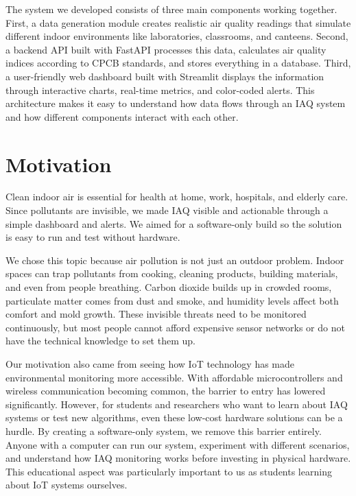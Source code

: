 \documentclass[12pt]{report}
\begin{document}
The system we developed consists of three main components working together. First, a data generation module creates realistic air quality readings that simulate different indoor environments like laboratories, classrooms, and canteens. Second, a backend API built with FastAPI processes this data, calculates air quality indices according to CPCB standards, and stores everything in a database. Third, a user-friendly web dashboard built with Streamlit displays the information through interactive charts, real-time metrics, and color-coded alerts. This architecture makes it easy to understand how data flows through an IAQ system and how different components interact with each other.

\section{Motivation}
Clean indoor air is essential for health at home, work, hospitals, and elderly care. Since pollutants are invisible, we made IAQ visible and actionable through a simple dashboard and alerts. We aimed for a software-only build so the solution is easy to run and test without hardware.

We chose this topic because air pollution is not just an outdoor problem. Indoor spaces can trap pollutants from cooking, cleaning products, building materials, and even from people breathing. Carbon dioxide builds up in crowded rooms, particulate matter comes from dust and smoke, and humidity levels affect both comfort and mold growth. These invisible threats need to be monitored continuously, but most people cannot afford expensive sensor networks or do not have the technical knowledge to set them up.

Our motivation also came from seeing how IoT technology has made environmental monitoring more accessible. With affordable microcontrollers and wireless communication becoming common, the barrier to entry has lowered significantly. However, for students and researchers who want to learn about IAQ systems or test new algorithms, even these low-cost hardware solutions can be a hurdle. By creating a software-only system, we remove this barrier entirely. Anyone with a computer can run our system, experiment with different scenarios, and understand how IAQ monitoring works before investing in physical hardware. This educational aspect was particularly important to us as students learning about IoT systems ourselves.

\end{document}
